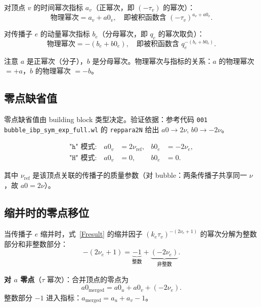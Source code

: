 ﻿\documentclass[a4paper,11pt]{article}
\begin{document}
对顶点 $v$ 的时间幂次指标 $a_v$（正幂次，即 $(-\tau_v)$ 的幂次）：
\begin{equation}
  \text{物理幂次} = a_v + a0_v, \quad \text{即被积函数含 } (-\tau_v)^{a_v + a0_v}.
  \label{adecomp}
\end{equation}

对传播子 $e$ 的动量幂次指标 $b_e$（分母幂次，即 $q_e$ 的幂次取负）：
\begin{equation}
  \text{物理幂次} = -(b_e + b0_e), \quad \text{即被积函数含 } q_e^{-(b_e + b0_e)}.
  \label{bdecomp}
\end{equation}

注意 $a$ 是正幂次（分子），$b$ 是分母幂次。物理幂次与指标的关系：$a$ 的物理幂次 $= +a$，$b$ 的物理幂次 $= -b$。

\subsection{零点缺省值}

零点缺省值由 building block 类型决定。验证依据：参考代码 \texttt{001 bubble\_ibp\_sym\_exp\_full.wl} 的 \texttt{reppara2N} 给出 $a0 \to 2\nu$, $b0 \to -2\nu$。

\begin{align}
  \texttt{"h" 模式:} \quad a0_v &= 2\nu_{\text{ref}}, & b0_e &= -2\nu_e, \label{zeroHmode} \\
  \texttt{"H" 模式:} \quad a0_v &= 0, & b0_e &= 0. \label{zeroHmodeH}
\end{align}

其中 $\nu_{\text{ref}}$ 是该顶点关联的传播子的质量参数（对 bubble：两条传播子共享同一 $\nu$，故 $a0 = 2\nu$）。

\subsection{缩并时的零点移位}

当传播子 $e$ 缩并时，式~\eqref{Fresult} 的缩并因子 $(k_e \tau_v)^{-(2\nu_e+1)}$ 的幂次分解为整数部分和非整数部分：
\begin{equation}
  -(2\nu_e + 1) = \underbrace{-1}_{\text{整数}} + \underbrace{(-2\nu_e)}_{\text{非整数}}.
  \label{shrinkDecomp}
\end{equation}

\textbf{对 $a$ 零点}（$\tau$ 幂次）：合并顶点的零点为
\begin{equation}
  a0_{\text{merged}} = a0_u + a0_v + (-2\nu_e).
  \label{a0merged}
\end{equation}
整数部分 $-1$ 进入指标：$a_{\text{merged}} = a_u + a_v - 1$。
\end{document}
